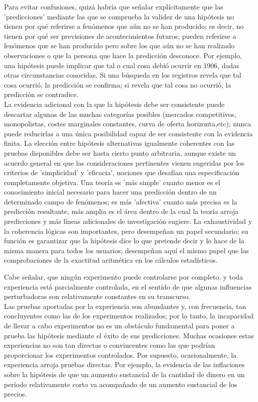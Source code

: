 Para evitar confusiones, quizá habría que señalar explícitamente que las 'predicciones' mediante las que se comprueba la validez de una hipótesis no tienen por qué referirse a fenómenos que aún no se han producido; es decir, no tienen por qué ser previsiones de acontecimientos futuros; pueden referirse a fenómenos que se han producido pero sobre los que aún no se han realizado observaciones o que la persona que hace la predicción desconoce. Por ejemplo, una hipótesis puede implicar que tal o cual cosa debió ocurrir en 1906, dadas otras circunstancias conocidas. Si una búsqueda en los registros revela que tal cosa ocurrió, la predicción se confirma; si revela que tal cosa no ocurrió, la predicción se contradice.\\

La evidencia adicional con la que la hipótesis debe ser consistente puede descartar algunas de las muchas categorías posibles (mercados competitivos, monopolistas, costes marginales constantes, curva de oferta horizonta,etc); nunca puede reducirlas a una única posibilidad capaz de ser consistente con la evidencia finita. La elección entre hipótesis alternativas igualmente coherentes con las pruebas disponibles debe ser hasta cierto punto arbitraria, aunque existe un acuerdo general en que las consideraciones pertinentes vienen sugeridas por los criterios de 'simplicidad' y 'eficacia', nociones que desafían una especificación completamente objetiva. Una teoría es 'más simple' cuanto menor es el conocimiento inicial necesario para hacer una predicción dentro de un determinado campo de fenómenos; es más 'afectiva' cuanto más precisa es la predicción resultante, más amplia es el área dentro de la cual la teoría arroja predicciones y más líneas adicionales de investigación sugiere. La exhaustividad y la coherencia lógicas son importantes, pero desempeñan un papel secundario; su función es garantizar que la hipótesis dice lo que pretende decir y lo hace de la misma manera para todos los usuarios; desempeñan aquí el mismo papel que las comprobaciones de la exactitud aritmética en los cálculos estadísticos.

Cabe señalar, que ningún experimento puede controlarse por completo, y toda experiencia está parcialmente controlada, en el sentido de que algunas influencias perturbadoras son relativamente constantes en su transcurso.\\
Las pruebas aportadas por la experiencia son abundantes y, con frecuencia, tan concluyentes como las de los experimentos realizados; por lo tanto, la incapacidad de llevar a cabo experimentos no es un obstáculo fundamental para poner a prueba las hipótesis mediante el éxito de sus predicciones. Muchas ocasiones estas experiencias no son tan directas o convincentes como las que podrían proporcionar los experimentos controlados. Por supuesto, ocasionalmente, la experiencia arroja pruebas directas. Por ejemplo, la evidencia de las inflaciones sobre la hipótesis de que un aumento sustancial de la cantidad de dinero en un período relativamente corto va acompañado de un aumento sustancial de los precios.\\


